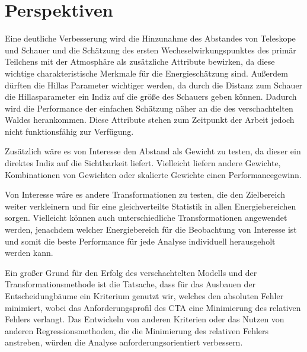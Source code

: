 \section{Perspektiven}

Eine deutliche Verbesserung wird die Hinzunahme des Abstandes von Teleskope und Schauer und die Schätzung des ersten
Wecheselwirkungspunktes des primär Teilchens mit der Atmosphäre als zusätzliche Attribute bewirken, da diese wichtige
charakteristische Merkmale für die Energieschätzung sind. Außerdem dürften die Hillas Parameter wichtiger werden, da durch
die Distanz zum Schauer die Hillasparameter ein Indiz auf die größe des Schauers geben können.
Dadurch wird die Performance der einfachen Schätzung näher an die des verschachtelten Waldes herankommen.
Diese Attribute stehen zum Zeitpunkt der Arbeit jedoch nicht funktionsfähig zur Verfügung.

Zusätzlich wäre es von Interesse den Abstand als Gewicht zu testen, da dieser ein direktes Indiz auf die Sichtbarkeit
liefert.
Vielleicht liefern andere Gewichte, Kombinationen von Gewichten oder skalierte Gewichte einen Performancegewinn.

Von Interesse wäre es andere Transformationen zu testen, die den Zielbereich weiter verkleinern und für eine gleichverteilte
Statistik in allen Energiebereichen sorgen.
Vielleicht können auch unterschiedliche Transformationen angewendet werden, jenachdem welcher Energiebereich für die
Beobachtung von Interesse ist und somit die beste Performance für jede Analyse individuell herausgeholt werden kann.

Ein großer Grund für den Erfolg des verschachtelten Modells und der Transformationsmethode ist die Tatsache, dass für das
Ausbauen der Entscheidungbäume ein Kriterium genutzt wir, welches den absoluten Fehler minimiert, wobei das Anforderungsprofil des
CTA eine Minimierung des relativen Fehlers verlangt.
Das Entwickeln von anderen Kriterien oder das Nutzen von anderen Regressionsmethoden, die die Minimierung des relativen Fehlers
anstreben, würden die Analyse anforderungsorientiert verbessern.
